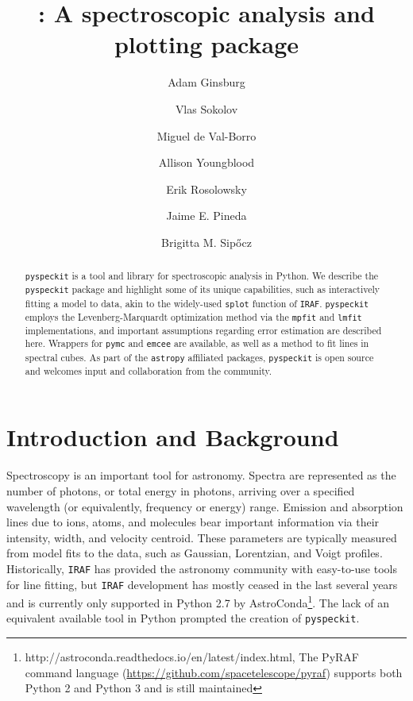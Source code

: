 \documentclass[twocolumn]{aastex62}
\newcommand{\pyspeckit}{\texttt{pyspeckit}\xspace}
\newcommand{\astropy}{\texttt{astropy}\xspace}
\begin{document}
\title{{:} A spectroscopic analysis and plotting package}

\author[0000-0001-6431-9633]{Adam Ginsburg}

\author{Vlas Sokolov}
\author{Miguel de Val-Borro}
\author{Allison Youngblood}
\author{Erik Rosolowsky}
\author[0000-0002-3972-1978]{Jaime E. Pineda}
\author[0000-0002-3713-6337]{Brigitta M. Sip\H{o}cz}


\begin{abstract}
\pyspeckit is a tool and library for spectroscopic analysis in Python. We
describe the \pyspeckit package and highlight some of its unique capabilities,
such as interactively fitting a model to data, akin to the widely-used
\texttt{splot} function of \texttt{IRAF}. \pyspeckit employs the
Levenberg-Marquardt optimization method via the \texttt{mpfit} and
\texttt{lmfit} implementations,
and important assumptions regarding error estimation are described here.
Wrappers for \texttt{pymc} and \texttt{emcee} are available, as well as a
method to fit lines in spectral cubes. As part of the \astropy affiliated
packages, \pyspeckit is open source and welcomes input and collaboration from
the community.
\end{abstract}


\section{Introduction and Background}
Spectroscopy is an important tool for astronomy. Spectra are represented as
the number of photons, or total energy in photons, arriving over a specified
wavelength (or equivalently, frequency or energy) range. Emission and
absorption lines due to ions, atoms, and molecules bear important information
via their intensity, width, and velocity centroid. These parameters are
typically measured from model fits to the data, such as Gaussian, Lorentzian,
and Voigt profiles. Historically, \texttt{IRAF} has provided the astronomy
community with easy-to-use tools for line fitting, but \texttt{IRAF}
development has mostly ceased in the last several years and is currently only
supported in Python 2.7 by
AstroConda\footnote{http://astroconda.readthedocs.io/en/latest/index.html,
The PyRAF command language
(\url{https://github.com/spacetelescope/pyraf}) supports both Python 2 and
Python 3 and is still maintained}.  The lack of an equivalent available
tool in Python prompted the creation of \pyspeckit.
\end{document}
